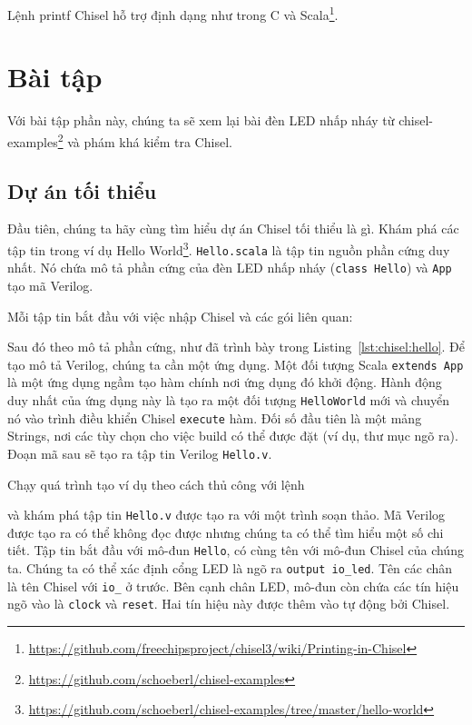 \documentclass[%
    10pt,
    headinclude, footexclude,
    openright, %
    notitlepage,
    cleardoubleempty,
    headsepline,
    pointlessnumbers,
    bibtotoc, idxtotoc,
    ]{scrbook}
\newcommand{\code}[1]{{\small{\texttt{#1}}}}
\newcommand{\todo}[1]{{\emph{TODO: #1}}}
\newcommand{\myref}[2]{\href{#1}{#2}}
\renewcommand{\myref}[2]{{#2}{\footnote{\url{#1}}}}
\renewcommand{\todo}[1]{}
\begin{document}
Lệnh printf Chisel hỗ trợ 
\myref{https://github.com/freechipsproject/chisel3/wiki/Printing-in-Chisel}{định dạng như trong C và Scala}.


\section{Bài tập}

Với bài tập phần này, chúng ta sẽ xem lại bài đèn LED nhấp nháy từ
\myref{https://github.com/schoeberl/chisel-examples}{chisel-examples}
và phám khá kiểm tra Chisel. \todo{Cũng sử dụng ví dụ ALU.}

\subsection{Dự án tối thiểu}

Đầu tiên, chúng ta hãy cùng tìm hiểu dự án Chisel tối thiểu là gì. Khám phá các tập tin trong ví dụ
\myref{https://github.com/schoeberl/chisel-examples/tree/master/hello-world}{Hello World}.
\code{Hello.scala} là tập tin nguồn phần cứng duy nhất.
Nó chứa mô tả phần cứng của đèn LED nhấp nháy (\code{class Hello})
và \code{App} tạo mã Verilog.

Mỗi tập tin bắt đầu với việc nhập Chisel và các gói liên quan:


\noindent Sau đó theo mô tả phần cứng, như đã trình bày trong Listing~\ref{lst:chisel:hello}.
Để tạo mô tả Verilog, chúng ta cần một ứng dụng. Một đối tượng Scala \code{extends App}
là một ứng dụng ngầm tạo hàm chính nơi ứng dụng đó khởi động.
Hành động duy nhất của ứng dụng này là tạo ra một đối tượng \code{HelloWorld} mới và chuyển nó vào 
trình điều khiển Chisel \code{execute} hàm. Đối số đầu tiên là một mảng Strings,
nơi các tùy chọn cho việc build có thể được đặt (ví dụ, thư mục ngõ ra). Đoạn mã sau sẽ tạo ra
tập tin Verilog \code{Hello.v}.


\noindent Chạy quá trình tạo ví dụ theo cách thủ công với lệnh


và khám phá tập tin \code{Hello.v} được tạo ra với một trình soạn thảo. Mã Verilog được tạo ra có thể không đọc được 
nhưng chúng ta có thể tìm hiểu một số chi tiết. Tập tin bắt đầu với mô-đun \code{Hello},
có cùng tên với mô-đun Chisel của chúng ta. Chúng ta có thể xác định cổng LED là ngõ ra
\code{output io\_led}. Tên các chân là tên Chisel với \code{io\_} ở trước.
Bên cạnh chân LED, mô-đun còn chứa các tín hiệu ngõ vào là \code{clock} và \code{reset}.
Hai tín hiệu này được thêm vào tự động bởi Chisel.
\end{document}
